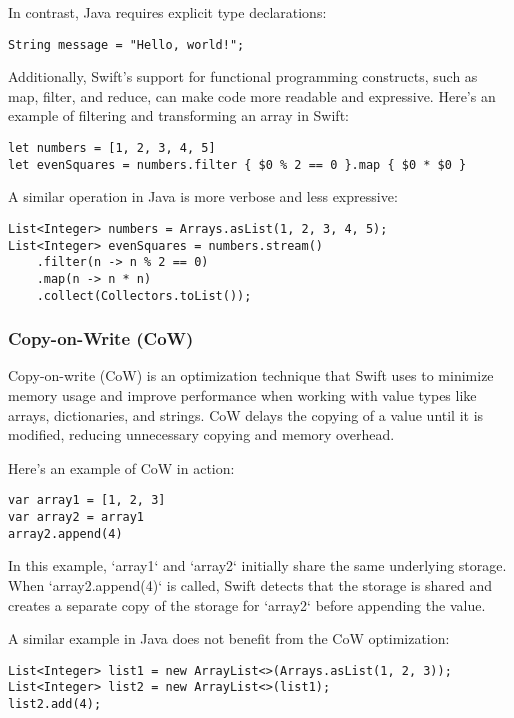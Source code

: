 In contrast, Java requires explicit type declarations:

\begin{verbatim}
String message = "Hello, world!";
\end{verbatim}

Additionally, Swift's support for functional programming constructs, such as map, filter, and reduce, can make code more readable and expressive. Here's an example of filtering and transforming an array in Swift:

\begin{verbatim}
let numbers = [1, 2, 3, 4, 5]
let evenSquares = numbers.filter { $0 % 2 == 0 }.map { $0 * $0 }
\end{verbatim}

A similar operation in Java is more verbose and less expressive:

\begin{verbatim}
List<Integer> numbers = Arrays.asList(1, 2, 3, 4, 5);
List<Integer> evenSquares = numbers.stream()
    .filter(n -> n % 2 == 0)
    .map(n -> n * n)
    .collect(Collectors.toList());
\end{verbatim}
\subsubsection{Copy-on-Write (CoW)}
Copy-on-write (CoW) is an optimization technique that Swift uses to minimize memory usage and improve performance when working with value types like arrays, dictionaries, and strings. CoW delays the copying of a value until it is modified, reducing unnecessary copying and memory overhead.

Here's an example of CoW in action:

\begin{verbatim}
var array1 = [1, 2, 3]
var array2 = array1
array2.append(4)
\end{verbatim}

In this example, `array1` and `array2` initially share the same underlying storage. When `array2.append(4)` is called, Swift detects that the storage is shared and creates a separate copy of the storage for `array2` before appending the value.

A similar example in Java does not benefit from the CoW optimization:

\begin{verbatim}
List<Integer> list1 = new ArrayList<>(Arrays.asList(1, 2, 3));
List<Integer> list2 = new ArrayList<>(list1);
list2.add(4);
\end{verbatim}

